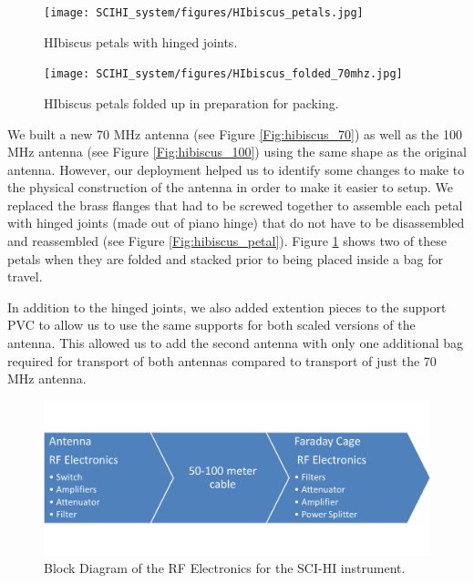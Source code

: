 \begin{figure}[htb]
\centering
\begin{minipage}[b]{0.33\textwidth}
\centering
\texttt{[image: SCIHI\_system/figures/HIbiscus\_petals.jpg]}
\caption{HIbiscus petals with hinged joints.}
\label{Fig:hibiscus_petal}
\end{minipage}%
\begin{minipage}[b]{0.02\textwidth}
\hspace{1cm}
\end{minipage}%
\begin{minipage}[b]{0.61\textwidth}
\centering
\texttt{[image: SCIHI\_system/figures/HIbiscus\_folded\_70mhz.jpg]}
\caption{HIbiscus petals folded up in preparation for packing.}
\label{Fig:hibiscus_fold}
\end{minipage}
\end{figure}

We built a new 70 MHz antenna (see Figure \ref{Fig:hibiscus_70}) as well as the 100 MHz antenna (see Figure \ref{Fig:hibiscus_100}) using the same shape as the original antenna. However, our deployment helped us to identify some changes to make to the physical construction of the antenna in order to make it easier to setup. We replaced the brass flanges that had to be screwed together to assemble each petal with hinged joints (made out of piano hinge) that do not have to be disassembled and reassembled (see Figure \ref{Fig:hibiscus_petal}). Figure \ref{Fig:hibiscus_fold} shows two of these petals when they are folded and stacked prior to being placed inside a bag for travel. 

In addition to the hinged joints, we also added extention pieces to the support PVC to allow us to use the same supports for both scaled versions of the antenna. This allowed us to add the second antenna with only one additional bag required for transport of both antennas compared to transport of just the 70 MHz antenna.  

\begin{figure}[htb]
\begin{center}
\includegraphics[width=0.9\linewidth]{SCIHI_system/figures/rf_electronics_block_diagram.png}
\caption{Block Diagram of the RF Electronics for the SCI-HI instrument.}
\label{Fig:RF_block_diagram}
\end{center}
\end{figure}

